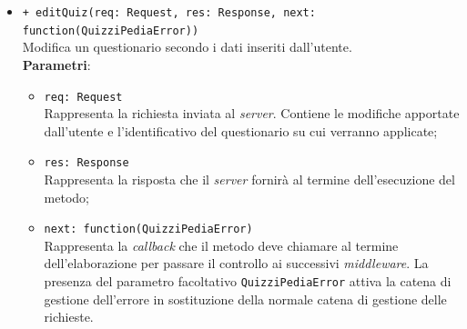 \begin{itemize}
\begin{itemize}
	\item \texttt{+ editQuiz(req: Request, res: Response, next: function(QuizziPediaError))}\\
		Modifica un questionario secondo i dati inseriti dall'utente.\\
		\textbf{Parametri}:
		\begin{itemize}
			\item \texttt{req: Request}\\
			Rappresenta la richiesta inviata al \textit{server}. Contiene le modifiche apportate dall'utente e l'identificativo del questionario su cui verranno applicate;
			\item \texttt{res: Response}\\
			Rappresenta la risposta che il \textit{server} fornirà al termine dell'esecuzione del metodo;
			\item \texttt{next: function(QuizziPediaError)}\\
			Rappresenta la \textit{callback} che il metodo deve chiamare al termine dell'elaborazione per passare il controllo ai successivi \textit{middleware}. La presenza del parametro facoltativo \texttt{QuizziPediaError} attiva la catena di gestione dell'errore in sostituzione della normale catena di gestione delle richieste.
		\end{itemize}
		

\end{itemize}
\end{itemize}
